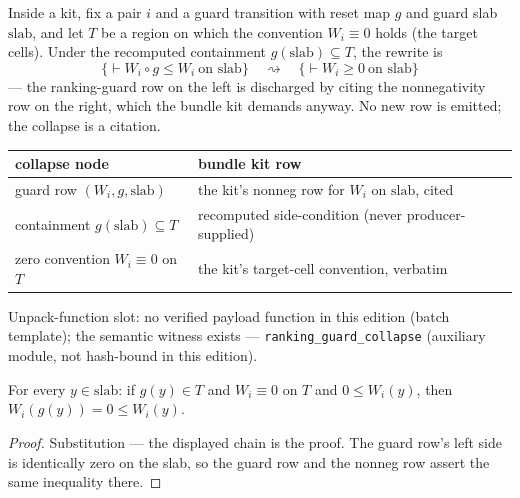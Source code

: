 

\begin{brecipe}
\label{rec:tcc-filled}
Inside a  kit, fix a pair $i$ and a guard
transition with reset map $g$ and guard slab $\mathrm{slab}$, and let $T$
be a region on which the convention $W_i \equiv 0$ holds (the target
cells). Under the recomputed containment $g(\mathrm{slab}) \subseteq T$,
the rewrite is
\[
\bigl\{\vdash W_i \circ g \le W_i \ \text{on } \mathrm{slab}\bigr\}
\quad\rightsquigarrow\quad
\bigl\{\vdash W_i \ge 0 \ \text{on } \mathrm{slab}\bigr\}
\]
--- the ranking-guard row on the left is discharged by citing the
nonnegativity row on the right, which the bundle kit demands anyway. No
new row is emitted; the collapse is a citation.
\end{brecipe}

\begin{brecipe}\label{rec:tcc-transport}
\begin{center}\small
\begin{tabular}{@{}ll@{}}
\textbf{collapse node} & \textbf{bundle kit row}\\
\midrule
guard row $(W_i, g, \mathrm{slab})$ & the kit's nonneg row for $W_i$ on $\mathrm{slab}$, cited\\
containment $g(\mathrm{slab}) \subseteq T$ & recomputed side-condition (never producer-supplied)\\
zero convention $W_i \equiv 0$ on $T$ & the kit's target-cell convention, verbatim\\
\end{tabular}
\end{center}
Unpack-function slot: no verified payload function in this edition (batch template); the
semantic witness exists --- \texttt{ranking\_guard\_collapse} (auxiliary
module, not hash-bound in this edition).
\end{brecipe}

\begin{bprop}\label{prop:tcc-exact}
For every $y \in \mathrm{slab}$: if $g(y) \in T$ and $W_i \equiv 0$ on
$T$ and $0 \le W_i(y)$, then $W_i(g(y)) = 0 \le W_i(y)$.
\end{bprop}
\begin{proof}
Substitution --- the displayed chain is the proof. The guard row's left
side is identically zero on the slab, so the guard row and the nonneg
row assert the same inequality there.
\end{proof}

